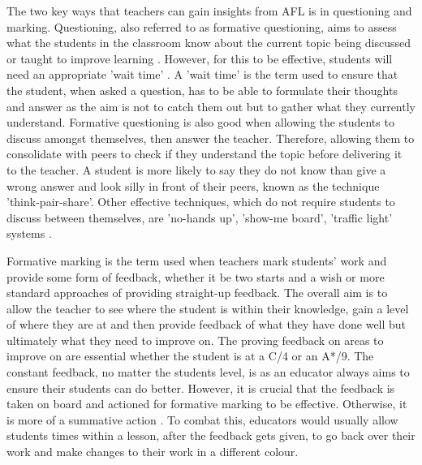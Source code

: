 		The two key ways that teachers can gain insights from AFL is in questioning and marking. Questioning, also referred to as formative questioning, aims to assess what the students in the classroom know about the current topic being discussed or taught to improve learning \cite{wellington2007secondary}. However, for this to be effective, students will need an appropriate 'wait time' \cite{black2001feedback}. A 'wait time' is the term used to ensure that the student, when asked a question, has to be able to formulate their thoughts and answer as the aim is not to catch them out but to gather what they currently understand. Formative questioning is also good when allowing the students to discuss amongst themselves, then answer the teacher. Therefore, allowing them to consolidate with peers to check if they understand the topic before delivering it to the teacher. A student is more likely to say they do not know than give a wrong answer and look silly in front of their peers, known as the technique 'think-pair-share'. Other effective techniques, which do not require students to discuss between themselves, are 'no-hands up', 'show-me board', 'traffic light' systems \cite{oecd}. 
	
		Formative marking is the term used when teachers mark students' work and provide some form of feedback, whether it be two starts and a wish or more standard approaches of providing straight-up feedback. The overall aim is to allow the teacher to see where the student is within their knowledge, gain a level of where they are at and then provide feedback of what they have done well but ultimately what they need to improve on. The proving feedback on areas to improve on are essential whether the student is at a C/4 or an A*/9. The constant feedback, no matter the students level, is as an educator always aims to ensure their students can do better. However, it is crucial that the feedback is taken on board and actioned for formative marking to be effective. Otherwise, it is more of a summative action \cite{black1998inside, william1990national}. To combat this, educators would usually allow students times within a lesson, after the feedback gets given, to go back over their work and make changes to their work in a different colour.
	
